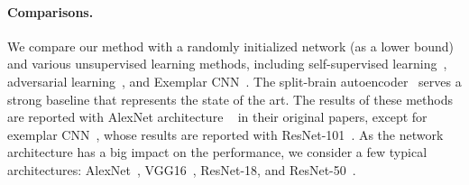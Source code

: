 \vspace{-9pt}
\paragraph{Comparisons.}
We compare our method
with a randomly initialized network (as a lower bound) and
various unsupervised learning methods, including
self-supervised learning~\cite{doersch2015unsupervised,zhang2016colorful,noroozi2016unsupervised,zhang2017split},
adversarial learning~\cite{donahue2016adversarial}, and
Exemplar CNN~\cite{doersch2017multi}.
The split-brain autoencoder~\cite{zhang2017split} serves a strong baseline that represents the state of the art.
The results of these methods are reported with
AlexNet architecture ~\cite{krizhevsky2012imagenet} in their original papers,
except for exemplar CNN~\cite{dosovitskiy2014discriminative},
whose results are reported with ResNet-101~\cite{doersch2017multi}.
As the network architecture has a big impact on the performance,
we consider a few typical architectures:
AlexNet~\cite{krizhevsky2012imagenet},
VGG16~\cite{simonyan2014very},
ResNet-18,
and ResNet-50~\cite{he2015deep}.



